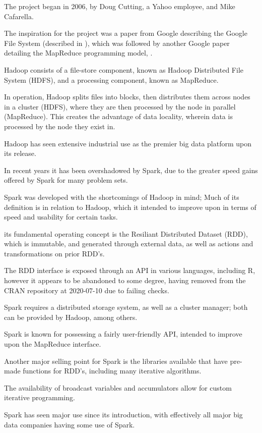 The project began in 2006, by Doug Cutting, a Yahoo employee, and Mike
Cafarella.

The inspiration for the project was a paper from Google describing the
Google File System (described in \cite{ghemawat2003google}), which was
followed by another Google paper detailing the MapReduce programming
model, \cite{dean2004mapreduce}.

Hadoop consists of a file-store component, known as Hadoop Distributed
File System (HDFS), and a processing component, known as MapReduce.

In operation, Hadoop splits files into blocks, then distributes them
across nodes in a cluster (HDFS), where they are then processed by the
node in parallel (MapReduce). This creates the advantage of data
locality, wherein data is processed by the node they exist in.

Hadoop has seen extensive industrial use as the premier big data
platform upon its release.

In recent years it has been overshadowed by Spark, due to the greater
speed gains offered by Spark for many problem sets.

Spark was developed with the shortcomings of Hadoop in mind; Much of
its definition is in relation to Hadoop, which it intended to improve
upon in terms of speed and usability for certain
tasks\cite{zaharia2010spark}.

its fundamental operating concept is the Resiliant Distributed Dataset
(RDD), which is immutable, and generated through external data, as well
as actions and transformations on prior RDD's.

The RDD interface is exposed through an API in various languages,
including R, however it appears to be abandoned to some degree, having
removed from the CRAN repository at 2020-07-10 due to failing checks.

Spark requires a distributed storage system, as well as a cluster
manager; both can be provided by Hadoop, among others.

Spark is known for possessing a fairly user-friendly API, intended to
improve upon the MapReduce interface.

Another major selling point for Spark is the libraries available that
have pre-made functions for RDD's, including many iterative algorithms.

The availability of broadcast variables and accumulators allow for
custom iterative programming.

Spark has seen major use since its introduction, with effectively all
major big data companies having some use of Spark.

